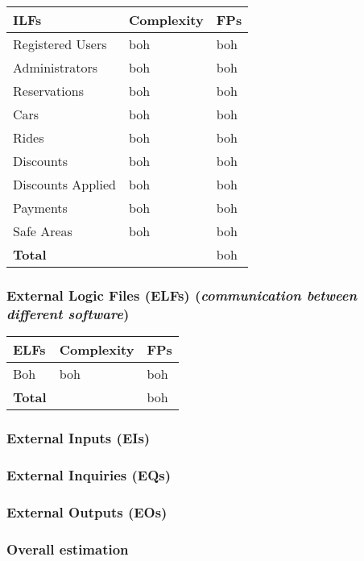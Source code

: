 \begin{center}
	\begin{tabular}{|l|l|l|}
		\hline
		\textbf{ILFs} 	& \textbf{Complexity} 	& \textbf{FPs} \\
		\hline
		Registered Users 	& boh 	& boh \\
		Administrators 	& boh 	& boh \\
		Reservations 	& boh 	& boh \\
		Cars 	& boh	& boh \\
		Rides 	& boh 	& boh \\
		Discounts 	& boh 	& boh \\
		Discounts Applied 	& boh 	& boh \\
		Payments 	& boh	& boh \\
		Safe Areas  	& boh	& boh \\
		\hline \hline
		\textbf{Total} 	& 	& boh \\
		\hline
	\end{tabular}
\end{center}

\subsubsection{External Logic Files (ELFs) (\textit{communication between different software})}

	
\begin{center}
	\begin{tabular}{|l|l|l|}
		\hline
		\textbf{ELFs} 	& \textbf{Complexity} 	& \textbf{FPs} \\
		\hline
		Boh 	& boh 	& boh \\

		\hline \hline
		\textbf{Total} 	& 	& boh \\
		\hline
	\end{tabular}
\end{center}


\subsubsection{External Inputs (EIs)}

	\todo{}

\subsubsection{External Inquiries (EQs)}

	\todo{}

\subsubsection{External Outputs (EOs)}

	\todo{}

\subsubsection{Overall estimation}

	\todo{}
